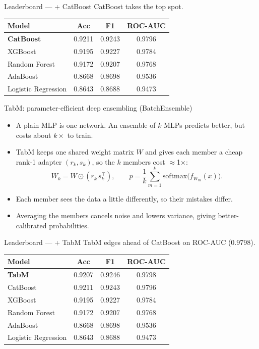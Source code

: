 \documentclass[aspectratio=169]{beamer}
\begin{document}
\begin{frame}{Leaderboard --- + CatBoost}
\footnotesize
CatBoost takes the top spot.
\vspace{0.25cm}
\begin{center}
\begin{tabular}{lccc}
\toprule
\textbf{Model} & \textbf{Acc} & \textbf{F1} & \textbf{ROC-AUC} \\
\midrule
\rowcolor{accent!18}\textbf{CatBoost} & 0.9211 & 0.9243 & 0.9796 \\
XGBoost & 0.9195 & 0.9227 & 0.9784 \\
Random Forest & 0.9172 & 0.9207 & 0.9768 \\
AdaBoost & 0.8668 & 0.8698 & 0.9536 \\
Logistic Regression & 0.8643 & 0.8688 & 0.9473 \\
\bottomrule
\end{tabular}
\end{center}
\end{frame}

\begin{frame}{TabM: parameter-efficient deep ensembling (BatchEnsemble)}
\small
\begin{itemize}
    \item A plain MLP is one network. An ensemble of $k$ MLPs predicts better,
          but costs about $k\times$ to train.
    \item TabM keeps one shared weight matrix $W$ and gives each member a cheap
          rank-1 adapter $(r_k,s_k)$, so the $k$ members cost $\approx$1$\times$:
    \[
    W_k = W \odot (r_k\,s_k^{\!\top}),\qquad
    \hat{p}=\frac{1}{k}\sum_{m=1}^{k}\mathrm{softmax}\big(f_{W_m}(x)\big).
    \]
    \item Each member sees the data a little differently, so their mistakes differ.
    \item Averaging the members cancels noise and lowers variance, giving
          better-calibrated probabilities.
\end{itemize}
\end{frame}

\begin{frame}{Leaderboard --- + TabM}
\footnotesize
TabM edges ahead of CatBoost on ROC-AUC (0.9798).
\vspace{0.25cm}
\begin{center}
\begin{tabular}{lccc}
\toprule
\textbf{Model} & \textbf{Acc} & \textbf{F1} & \textbf{ROC-AUC} \\
\midrule
\rowcolor{accent!18}\textbf{TabM} & 0.9207 & 0.9246 & 0.9798 \\
CatBoost & 0.9211 & 0.9243 & 0.9796 \\
XGBoost & 0.9195 & 0.9227 & 0.9784 \\
Random Forest & 0.9172 & 0.9207 & 0.9768 \\
AdaBoost & 0.8668 & 0.8698 & 0.9536 \\
Logistic Regression & 0.8643 & 0.8688 & 0.9473 \\
\bottomrule
\end{tabular}
\end{center}
\end{frame}
\end{document}
